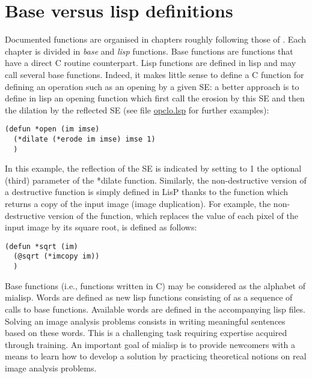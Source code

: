 \documentclass{book}
\renewcommand{\SE}{{SE}}
\renewcommand{\htmladdnormallink}[2]{\href{#2}{#1}}
\begin{document}
\section{Base versus lisp definitions}
Documented functions are organised in chapters roughly following those of \citep{soille99,soille2004sv}.  Each chapter is divided in {\em base\/} and {\em lisp\/} functions.  Base functions are functions that have a direct C routine counterpart.  Lisp functions are defined in lisp and may call several base functions.  Indeed, it makes little sense to define a C function for defining an operation such as an opening by a given {\SE}: a better approach is to define in lisp an opening function which first call the erosion by this {\SE} and then the dilation by the reflected {\SE} (see file  \htmladdnormallink{opclo.lsp}{../lsp/opclo.lsp} for further examples):
\begin{verbatim}
(defun *open (im imse)
  (*dilate (*erode im imse) imse 1)
  )
\end{verbatim}
In this example, the reflection of the {\SE} is indicated by setting to 1 the optional (third) parameter of the *dilate function.  Similarly, the non-destructive version of a destructive function is simply defined in LisP thanks to the  function which returns a copy of the input image (image duplication).  For example, the non-destructive version of the  function, which replaces the value of each pixel of the input image by its square root, is defined as follows:
\begin{verbatim}
(defun *sqrt (im)
  (@sqrt (*imcopy im))
  )
\end{verbatim}

Base functions (i.e., functions written in C) may be considered as the alphabet of mialisp.  Words are defined as new lisp functions consisting of as a sequence of calls to base functions.  Available words are defined in the accompanying lisp files.  Solving an image analysis problems consists in writing meaningful sentences based on these words. This is a challenging task requiring expertise acquired through training.  An important goal of mialisp is to provide newcomers with a means to learn how to develop a solution by practicing theoretical notions on real image analysis problems.

\end{document}
